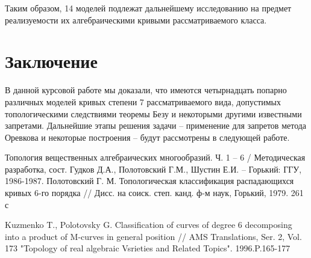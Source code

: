 \documentclass[14pt]{article}
\begin{document}
Таким образом, 14 моделей подлежат дальнейшему исследованию на предмет реализуемости их алгебраическими кривыми рассматриваемого класса.

\newpage
\section{Заключение}
В данной курсовой работе мы доказали, что имеются четырнадцать попарно различных моделей кривых степени 7 рассматриваемого вида, допустимых топологическими следствиями теоремы Безу и некоторыми другими известными запретами. Дальнейшие этапы решения задачи -- применение для запретов метода Оревкова и некоторые построения -- будут рассмотрены в следующей работе.

\newpage
{}
\begin{thebibliography}{}
 Топология вещественных алгебраических многообразий. Ч. 1 -- 6 / Методическая разработка, сост. Гудков Д.А., Полотовский Г.М., Шустин Е.И. -- Горький: ГГУ, 1986-1987.
Полотовский Г. М. Топологическая классификация распадающихся кривых 6-го порядка // Дисс. на соиск. степ. канд. ф-м наук, Горький, 1979. 261 с

Kuzmenko T., Polotovsky G. Classification of curves of degree 6 decomposing into a product of M-curves in general position // AMS Translations, Ser. 2, Vol. 173 "Topology of real algebraic Vsrieties and Related Topics". 1996.P.165-177

\end{thebibliography}


\makeatother
\end{document}
